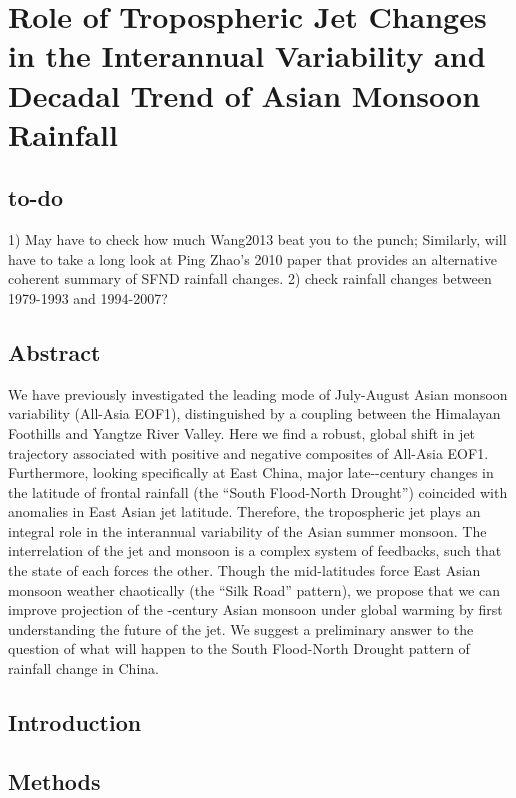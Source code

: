 \chapter{Role of Tropospheric Jet Changes in the Interannual Variability and Decadal Trend of Asian Monsoon Rainfall}

\section{to-do}
1) May have to check how much Wang2013 beat you to the punch; Similarly, will have to take a long look at Ping Zhao's 2010 paper that provides an alternative coherent summary of SFND rainfall changes. 2) check rainfall changes between 1979-1993 and 1994-2007?

\section{Abstract}
We have previously investigated the leading mode of July-August Asian monsoon variability (All-Asia EOF1), distinguished by a coupling between the Himalayan Foothills and Yangtze River Valley. Here we find a robust, global shift in jet trajectory associated with positive and negative composites of All-Asia EOF1. Furthermore, looking specifically at East China, major late--century changes in the latitude of frontal rainfall (the ``South Flood-North Drought'') coincided with anomalies in East Asian jet latitude. Therefore, the tropospheric jet plays an integral role in the interannual variability of the Asian summer monsoon. The interrelation of the jet and monsoon is a complex system of feedbacks, such that the state of each forces the other. Though the mid-latitudes force East Asian monsoon weather chaotically (the ``Silk Road'' pattern), we propose that we can improve projection of the -century Asian monsoon under global warming by first understanding the future of the jet. We suggest a preliminary answer to the question of what will happen to the South Flood-North Drought pattern of rainfall change in China.

\section{Introduction}


\section{Methods}

